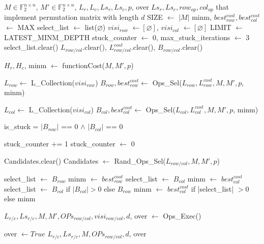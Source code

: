 \begin{algorithm}[htbp]
\caption{Row-or-Col Greedy}
\label{alg:row-or-col-greedy}
\footnotesize
\begin{algorithmic}[1]
\Require $M \in \mathbb{F}_{2}^{n \times n}$, $M' \in \mathbb{F}_{2}^{n \times n}$, $L_{r}, L_{c}, Ls_{r}, Ls_{c}, p$, over
\Ensure $Ls_{r}, Ls_{c}, row_{op}, col_{op}$ that implement permutation matrix with length $d$
\State SIZE $\leftarrow$ $|M|$
\State minm, $best_{row}^{cost}, best_{col}^{cost}$ $\leftarrow$ MAX
\State select\_list $\leftarrow$ list($\varnothing$)
\State $visi_{row}$ $\leftarrow [\varnothing]$, $visi_{col}$ $\leftarrow [\varnothing]$
\State LIMIT $\leftarrow$ LATEST\_MINM\_DEPTH
\State stuck\_counter $\leftarrow$ 0, max\_stuck\_iterations $\leftarrow$ 3
	\State select\_list.clear()
	\State $L_{row/col}$.clear(), $L_{row/col}^{cost}$.clear(), $B_{row/col}$.clear()
	
	\State $H_{r}, H_{c}$, minm $\leftarrow$ functionCost($M, M', p$)
    
	\State $L_{row} \leftarrow$ L\_Collection($visi_{row}$)
	\State $B_{row}, best_{row}^{cost} \leftarrow$ Ops\_Sel($L_{row}, L_{row}^{cost}, M, M', p$, minm)
	
	\State $L_{col} \leftarrow$ L\_Collection($visi_{col}$)
	\State $B_{col}, best_{col}^{cost} \leftarrow$ Ops\_Sel($L_{col}, L_{col}^{cost}, M, M', p$, minm)
	
	\State is\_stuck = $|B_{row}|$ == 0 $\land$ $|B_{col}|$ == 0
	
		\State stuck\_counter += 1
	\Else
		\State stuck\_counter $\leftarrow$ 0
    \EndIf
    
		\State Candidates.clear()
		\State Candidates $\leftarrow$ Rand\_Ops\_Sel($L_{row/col}, M, M', p$)
    \EndIf
    
		\State select\_list $\leftarrow$ $B_{row}$
		\State minm $\leftarrow$ $best_{row}^{cost}$
		\State select\_list $\leftarrow$ $B_{col}$
		\State minm $\leftarrow$ $best_{col}^{cost}$
	\Else
		\State select\_list $\leftarrow$ $B_{col}$ if $|B_{col}| > 0 $ else $B_{row}$
		\State minm $\leftarrow$ $best_{col}^{cost}$ if |select\_list| $> 0$ else minm
    \EndIf
    
	\State $L_{r/c}, Ls_{r/c}, M, M', OPs_{row/col}, visi_{row/col}, d$, over $\leftarrow$ Ops\_Exec()
    
	    \State over $\leftarrow True$ 
	    \State \Return
    \EndIf
\EndWhile
\State \Return $L_{r/c}, Ls_{r/c}, M, OPs_{row/col}, d$, over
\end{algorithmic}
\end{algorithm}

